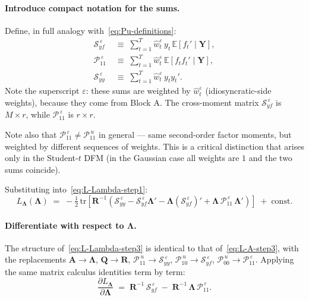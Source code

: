 \documentclass[11pt, a4paper, oneside]{article}
\newcommand{\mY}{\mathbf{Y}}
\newcommand{\mL}{\boldsymbol{\Lambda}}
\newcommand{\mA}{\mathbf{A}}
\newcommand{\mR}{\mathbf{R}}
\newcommand{\mQ}{\mathbf{Q}}
\begin{document}
\paragraph{Introduce compact notation for the sums.}
Define, in full analogy with~\eqref{eq:Pu-definitions}:
\begin{equation}
\boxed{\;\;
\begin{aligned}
\mathcal{S}_{yf}^{\,\varepsilon}
&\;\equiv\; \sum_{t=1}^{T} \hat{w}^\varepsilon_t\, y_t\, \mathbb{E}[f_t' \mid \mY], \\[3pt]
\mathcal{P}_{11}^{\,\varepsilon}
&\;\equiv\; \sum_{t=1}^{T} \hat{w}^\varepsilon_t\, \mathbb{E}[f_t f_t' \mid \mY], \\[3pt]
\mathcal{S}_{yy}^{\,\varepsilon}
&\;\equiv\; \sum_{t=1}^{T} \hat{w}^\varepsilon_t\, y_t y_t'.
\end{aligned}
\;\;}
\label{eq:Sye-definitions}
\end{equation}
Note the superscript $\varepsilon$: these sums are weighted by
$\hat{w}^\varepsilon_t$ (idiosyncratic-side weights), because they
come from Block A. The cross-moment matrix $\mathcal{S}_{yf}^{\,\varepsilon}$ is
$M \times r$, while $\mathcal{P}_{11}^{\,\varepsilon}$ is $r \times r$.

Note also that $\mathcal{P}_{11}^{\,\varepsilon} \neq \mathcal{P}_{11}^{\,u}$
in general — same second-order factor moments, but weighted by
different sequences of weights. This is a critical distinction that
arises only in the Student-$t$ DFM (in the Gaussian case all weights
are $1$ and the two sums coincide).

Substituting into~\eqref{eq:L-Lambda-step1}:
\begin{equation}
L_{\mL}(\mL) \;=\; -\tfrac{1}{2}\,\mathrm{tr}\!\left[\mR^{-1}\!\left(
\mathcal{S}_{yy}^{\,\varepsilon} - \mathcal{S}_{yf}^{\,\varepsilon}\mL' - \mL (\mathcal{S}_{yf}^{\,\varepsilon})' + \mL\, \mathcal{P}_{11}^{\,\varepsilon}\, \mL'\right)\right] \;+\; \text{const}.
\label{eq:L-Lambda-step3}
\end{equation}

\paragraph{Differentiate with respect to $\mL$.}
The structure of~\eqref{eq:L-Lambda-step3} is identical to that
of~\eqref{eq:L-A-step3}, with the replacements
$\mA \to \mL$, $\mQ \to \mR$,
$\mathcal{P}_{11}^{\,u} \to \mathcal{S}_{yy}^{\,\varepsilon}$,
$\mathcal{P}_{10}^{\,u} \to \mathcal{S}_{yf}^{\,\varepsilon}$,
$\mathcal{P}_{00}^{\,u} \to \mathcal{P}_{11}^{\,\varepsilon}$. Applying
the same matrix calculus identities term by term:
\begin{equation}
\frac{\partial L_{\mL}}{\partial \mL}
\;=\; \mR^{-1}\,\mathcal{S}_{yf}^{\,\varepsilon} \;-\; \mR^{-1}\,\mL\,\mathcal{P}_{11}^{\,\varepsilon}.
\label{eq:grad-Lambda}
\end{equation}
\end{document}
